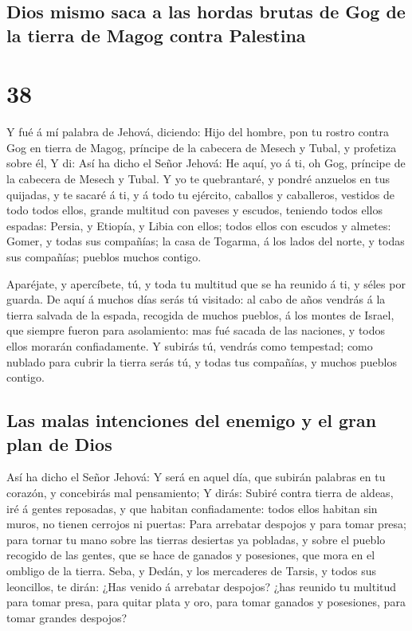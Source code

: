 \hypertarget{dios-mismo-saca-a-las-hordas-brutas-de-gog-de-la-tierra-de-magog-contra-palestina}{%
\subsection{Dios mismo saca a las hordas brutas de Gog de la tierra de
Magog contra
Palestina}\label{dios-mismo-saca-a-las-hordas-brutas-de-gog-de-la-tierra-de-magog-contra-palestina}}

\hypertarget{section-26-38}{%
\section{38}\label{section-26-38}}

 Y fué á mí palabra de Jehová, diciendo: 
Hijo del hombre, pon tu rostro contra Gog en tierra de Magog, príncipe
de la cabecera de Mesech y Tubal, y profetiza sobre él,  Y
di: Así ha dicho el Señor Jehová: He aquí, yo á ti, oh Gog, príncipe de
la cabecera de Mesech y Tubal.  Y yo te quebrantaré, y
pondré anzuelos en tus quijadas, y te sacaré á ti, y á todo tu ejército,
caballos y caballeros, vestidos de todo todos ellos, grande multitud con
paveses y escudos, teniendo todos ellos espadas:  Persia,
y Etiopía, y Libia con ellos; todos ellos con escudos y almetes:
 Gomer, y todas sus compañías; la casa de Togarma, á los
lados del norte, y todas sus compañías; pueblos muchos contigo.

 Aparéjate, y apercíbete, tú, y toda tu multitud que se ha
reunido á ti, y séles por guarda.  De aquí á muchos días
serás tú visitado: al cabo de años vendrás á la tierra salvada de la
espada, recogida de muchos pueblos, á los montes de Israel, que siempre
fueron para asolamiento: mas fué sacada de las naciones, y todos ellos
morarán confiadamente.  Y subirás tú, vendrás como
tempestad; como nublado para cubrir la tierra serás tú, y todas tus
compañías, y muchos pueblos contigo.

\hypertarget{las-malas-intenciones-del-enemigo-y-el-gran-plan-de-dios}{%
\subsection{Las malas intenciones del enemigo y el gran plan de
Dios}\label{las-malas-intenciones-del-enemigo-y-el-gran-plan-de-dios}}

 Así ha dicho el Señor Jehová: Y será en aquel día, que
subirán palabras en tu corazón, y concebirás mal pensamiento;
 Y dirás: Subiré contra tierra de aldeas, iré á gentes
reposadas, y que habitan confiadamente: todos ellos habitan sin muros,
no tienen cerrojos ni puertas:  Para arrebatar despojos y
para tomar presa; para tornar tu mano sobre las tierras desiertas ya
pobladas, y sobre el pueblo recogido de las gentes, que se hace de
ganados y posesiones, que mora en el ombligo de la tierra.
 Seba, y Dedán, y los mercaderes de Tarsis, y todos sus
leoncillos, te dirán: ¿Has venido á arrebatar despojos? ¿has reunido tu
multitud para tomar presa, para quitar plata y oro, para tomar ganados y
posesiones, para tomar grandes despojos?

